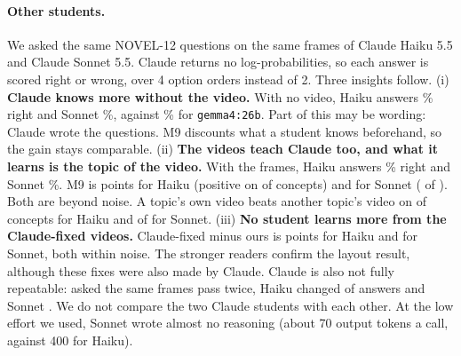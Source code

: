 \paragraph{Other students.} We asked the same NOVEL-12 questions on the same frames of Claude Haiku 5.5 and Claude
Sonnet 5.5. Claude returns no log-probabilities, so each answer is scored right or wrong, over 4 option orders
instead of 2. Three insights follow.
(i) \textbf{Claude knows more without the video.} With no video, Haiku answers \AccHaikuBlind\% right and Sonnet
\AccSonnetBlind\%, against \AccGemmaBlind\% for \texttt{gemma4:26b}. Part of this may be wording: Claude wrote the
questions. M9 discounts what a student knows beforehand, so the gain stays comparable.
(ii) \textbf{The videos teach Claude too, and what it learns is the topic of the video.} With the frames, Haiku
answers \AccHaikuFrames\% right and Sonnet \AccSonnetFrames\%. M9 is \NMHGain{} points for Haiku (positive on
\NMHGainPos{} of \NMHGainN{} concepts) and \NMSGain{} for Sonnet (\NMSGainPos{} of \NMSGainN{}). Both are beyond
noise. A topic's own video beats another topic's video on \NMHSpecPos{} of \NMHSpecN{} concepts for Haiku and
\NMSSpecPos{} of \NMSSpecN{} for Sonnet.
(iii) \textbf{No student learns more from the Claude-fixed videos.} Claude-fixed minus ours is \NMHLayout{} points
for Haiku and \NMSLayout{} for Sonnet, both within noise. The stronger readers confirm the layout result, although
these fixes were also made by Claude.
Claude is also not fully repeatable: asked the same frames pass twice, Haiku changed \NMHRepChanged{} of
\NMHRepN{} answers and Sonnet \NMSRepChanged{}. We do not compare the two Claude students with each other. At the
low effort we used, Sonnet wrote almost no reasoning (about 70 output tokens a call, against 400 for Haiku).

